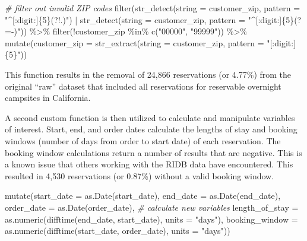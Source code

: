 \documentclass[
]{book}
\newenvironment{Shaded}{\begin{snugshade}}{\end{snugshade}}
\newcommand{\AttributeTok}[1]{\textcolor[rgb]{0.77,0.63,0.00}{#1}}
\newcommand{\CommentTok}[1]{\textcolor[rgb]{0.56,0.35,0.01}{\textit{#1}}}
\newcommand{\FunctionTok}[1]{\textcolor[rgb]{0.00,0.00,0.00}{#1}}
\newcommand{\NormalTok}[1]{#1}
\newcommand{\SpecialCharTok}[1]{\textcolor[rgb]{0.00,0.00,0.00}{#1}}
\newcommand{\StringTok}[1]{\textcolor[rgb]{0.31,0.60,0.02}{#1}}
\begin{document}
\begin{Shaded}
\begin{Highlighting}[]
\CommentTok{\# filter out invalid ZIP codes}
\FunctionTok{filter}\NormalTok{(}\FunctionTok{str\_detect}\NormalTok{(}\AttributeTok{string =}\NormalTok{ customer\_zip,}
                  \AttributeTok{pattern =} \StringTok{"\^{}[:digit:]\{5\}(?!.)"}\NormalTok{) }\SpecialCharTok{|}
         \FunctionTok{str\_detect}\NormalTok{(}\AttributeTok{string =}\NormalTok{ customer\_zip,}
                    \AttributeTok{pattern =} \StringTok{"\^{}[:digit:]\{5\}(?={-})"}\NormalTok{)) }\SpecialCharTok{\%\textgreater{}\%}
  \FunctionTok{filter}\NormalTok{(}\SpecialCharTok{!}\NormalTok{customer\_zip }\SpecialCharTok{\%in\%} \FunctionTok{c}\NormalTok{(}\StringTok{"00000"}\NormalTok{, }\StringTok{"99999"}\NormalTok{)) }\SpecialCharTok{\%\textgreater{}\%}
  \FunctionTok{mutate}\NormalTok{(}\AttributeTok{customer\_zip =} \FunctionTok{str\_extract}\NormalTok{(}\AttributeTok{string =}\NormalTok{ customer\_zip,}
                                    \AttributeTok{pattern =} \StringTok{"[:digit:]\{5\}"}\NormalTok{))}
\end{Highlighting}
\end{Shaded}

This function results in the removal of 24,866 reservations (or 4.77\%) from the original ``raw'' dataset that included all reservations for reservable overnight campsites in California.

A second custom function is then utilized to calculate and manipulate variables of interest. Start, end, and order dates calculate the lengths of stay and booking windows (number of days from order to start date) of each reservation. The booking window calculations return a number of results that are negative. This is a known issue that others working with the RIDB data have encountered. This resulted in 4,530 reservations (or 0.87\%) without a valid booking window.

\begin{Shaded}
\begin{Highlighting}[]
\FunctionTok{mutate}\NormalTok{(}\AttributeTok{start\_date =} \FunctionTok{as.Date}\NormalTok{(start\_date),}
       \AttributeTok{end\_date =} \FunctionTok{as.Date}\NormalTok{(end\_date),}
       \AttributeTok{order\_date =} \FunctionTok{as.Date}\NormalTok{(order\_date),}
       \CommentTok{\# calculate new variables}
       \AttributeTok{length\_of\_stay =} \FunctionTok{as.numeric}\NormalTok{(}\FunctionTok{difftime}\NormalTok{(end\_date, start\_date), }\AttributeTok{units =} \StringTok{"days"}\NormalTok{),}
       \AttributeTok{booking\_window =} \FunctionTok{as.numeric}\NormalTok{(}\FunctionTok{difftime}\NormalTok{(start\_date, order\_date), }\AttributeTok{units =} \StringTok{"days"}\NormalTok{))}
\end{Highlighting}
\end{Shaded}
\end{document}
